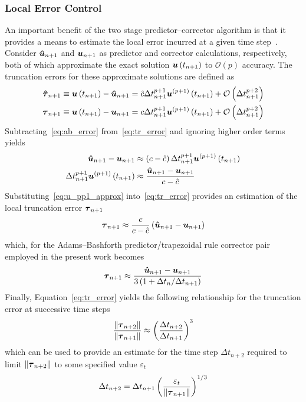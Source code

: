 \subsubsection*{Local Error Control}
An important benefit of the two stage predictor--corrector algorithm is that it provides a means to estimate the local error incurred at a given time step~\cite{iserles_numerical_analysis}.  Consider ${\boldsymbol{\hat{u}}}_{n+1}$ and ${\boldsymbol{u}}_{n+1}$ as predictor and corrector calculations, respectively, both of which approximate the exact solution ${\boldsymbol{u}}\left(t_{n+1}\right)$ to $\mathcal{O}(p)$ accuracy.  The truncation errors for these approximate solutions are defined as
\begin{align}
  \label{eq:ab_error}
  {\boldsymbol{\hat{\tau}}}_{n+1} &\equiv {\boldsymbol{u}}\left(t_{n+1}\right) - {\boldsymbol{\hat{u}}}_{n+1} = \hat{c} \Delta t_{n+1}^{p+1} {\boldsymbol{u}}^{(p+1)}\left(t_{n+1}\right) + \mathcal{O}\left(\Delta t_{n+1}^{p+2}\right) \\
  \label{eq:tr_error}
  {\boldsymbol{\tau}}_{n+1} &\equiv {\boldsymbol{u}}\left(t_{n+1}\right) - {\boldsymbol{u}}_{n+1} = c \Delta t_{n+1}^{p+1} {\boldsymbol{u}}^{(p+1)}\left(t_{n+1}\right) + \mathcal{O}\left(\Delta t_{n+1}^{p+2}\right)
\end{align}
Subtracting~\eqref{eq:ab_error} from~\eqref{eq:tr_error} and ignoring higher order terms yields
\begin{align}
  \nonumber
   {\boldsymbol{\hat{u}}}_{n+1} - {\boldsymbol{u}}_{n+1} &\approx \left(c - \hat{c}\right)\Delta t_{n+1}^{p+1} {\boldsymbol{u}}^{(p+1)}\left(t_{n+1}\right) \\
   \label{eq:u_pp1_approx}
   \Delta t_{n+1}^{p+1} {\boldsymbol{u}}^{(p+1)}\left(t_{n+1}\right) &\approx \frac{{\boldsymbol{\hat{u}}}_{n+1} - {\boldsymbol{u}}_{n+1}}{c - \hat{c}}
\end{align}
Substituting~\eqref{eq:u_pp1_approx} into~\eqref{eq:tr_error} provides an estimation of the local truncation error ${\boldsymbol{\tau}}_{n+1}$
\begin{equation}
  \label{eq:u_np1_error}
  {\boldsymbol{\tau}}_{n+1} \approx \frac{c}{c - \hat{c}}\left({\boldsymbol{\hat{u}}}_{n+1} - {\boldsymbol{u}}_{n+1}\right)
\end{equation}
which, for the Adams--Bashforth predictor/trapezoidal rule corrector pair employed in the present work  becomes
\begin{equation}
  \label{eq:u_np1_ab_tr_error}
  {\boldsymbol{\tau}}_{n+1} \approx \frac{{\boldsymbol{\hat{u}}}_{n+1} - {\boldsymbol{u}}_{n+1}}{3\left(1 + \Delta t_n/\Delta t_{n+1}\right)}
\end{equation}
Finally, Equation~\eqref{eq:tr_error} yields the following relationship for the truncation error at successive time steps
\begin{equation}
  \label{eq:tau_np2_ratio}
  \frac{\|{\boldsymbol{\tau}}_{n+2}\|}{\|{\boldsymbol{\tau}}_{n+1}\|} \approx \left(\frac{\Delta t_{n+2}}{\Delta t_{n+1}}\right)^{3}
\end{equation}
which can be used to provide an estimate for the time step $\Delta t_{n+2}$ required to limit $\|{\boldsymbol{\tau}}_{n+2}\|$ to some specified value $\varepsilon_t$
\begin{equation}
  \label{eq:dt_comp}
  \Delta t_{n+2} = \Delta t_{n+1} \left(\frac{\varepsilon_t}{\| {\boldsymbol{\tau}}_{n+1}\|}\right)^{1/3}
\end{equation}

